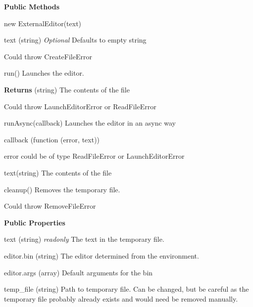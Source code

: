 {\bfseries Public Methods}
\begin{DoxyItemize}
\item {\ttfamily new External\+Editor(text)}
\begin{DoxyItemize}
\item {\ttfamily text} (string) {\itshape Optional} Defaults to empty string
\item Could throw {\ttfamily Create\+File\+Error}
\end{DoxyItemize}
\item {\ttfamily run()} Launches the editor.
\begin{DoxyItemize}
\item {\bfseries Returns} (string) The contents of the file
\item Could throw {\ttfamily Launch\+Editor\+Error} or {\ttfamily Read\+File\+Error}
\end{DoxyItemize}
\item {\ttfamily run\+Async(callback)} Launches the editor in an async way
\begin{DoxyItemize}
\item {\ttfamily callback} (function (error, text))
\begin{DoxyItemize}
\item {\ttfamily error} could be of type {\ttfamily Read\+File\+Error} or {\ttfamily Launch\+Editor\+Error}
\item {\ttfamily text}(string) The contents of the file
\end{DoxyItemize}
\end{DoxyItemize}
\item {\ttfamily cleanup()} Removes the temporary file.
\begin{DoxyItemize}
\item Could throw {\ttfamily Remove\+File\+Error}
\end{DoxyItemize}
\end{DoxyItemize}

{\bfseries Public Properties}
\begin{DoxyItemize}
\item {\ttfamily text} (string) {\itshape readonly} The text in the temporary file.
\item {\ttfamily editor.\+bin} (string) The editor determined from the environment.
\item {\ttfamily editor.\+args} (array) Default arguments for the bin
\item {\ttfamily temp\+\_\+file} (string) Path to temporary file. Can be changed, but be careful as the temporary file probably already exists and would need be removed manually.
\end{DoxyItemize}

